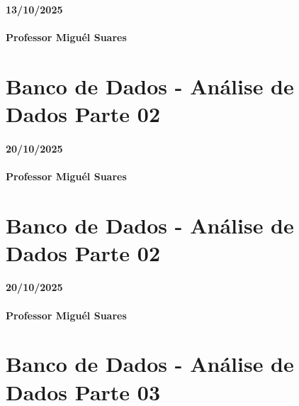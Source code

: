 \documentclass[
]{book}
\begin{document}
\subsubsection*{13/10/2025}\label{section-16}

\subsubsection*{Professor Miguél Suares}\label{professor-miguuxe9l-suares-16}

\chapter{Banco de Dados - Análise de Dados Parte 02}\label{banco-de-dados---anuxe1lise-de-dados-parte-02}

\subsubsection*{20/10/2025}\label{section-17}

\subsubsection*{Professor Miguél Suares}\label{professor-miguuxe9l-suares-17}

\chapter{Banco de Dados - Análise de Dados Parte 02}\label{banco-de-dados---anuxe1lise-de-dados-parte-02-1}

\subsubsection*{20/10/2025}\label{section-18}

\subsubsection*{Professor Miguél Suares}\label{professor-miguuxe9l-suares-18}

\chapter{Banco de Dados - Análise de Dados Parte 03}\label{banco-de-dados---anuxe1lise-de-dados-parte-03}
\end{document}
